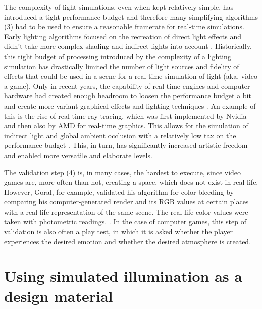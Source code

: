 The complexity of light simulations, even when kept relatively simple, has introduced a tight performance budget and therefore many simplifying algorithms (3) had to be used to ensure a reasonable framerate for real-time simulations. Early lighting algorithms focused on the recreation of direct light effects and didn't take more complex shading and indirect lights into account \cite{Niedenthal1404353}, Historically, this tight budget of processing introduced by the complexity of a lighting simulation has drastically limited the number of light sources and fidelity of effects that could be used in a scene for a real-time simulation of light (aka. video a game). Only in recent years, the capability of real-time engines and computer hardware had created enough headroom to loosen the performance budget a bit and create more variant graphical effects and lighting techniques \cite{Niedenthal1404353}. An example of this is the rise of real-time ray tracing, which was first implemented by Nvidia and then also by AMD for real-time graphics. This allows for the simulation of indirect light and global ambient occlusion with a relatively low tax on the performance budget \cite{RTXON}. This, in turn, has significantly increased artistic freedom and enabled more versatile and elaborate levels. 

The validation step (4) is, in many cases, the hardest to execute, since video games are, more often than not, creating a space, which does not exist in real life. However, Goral, for example, validated his algorithm for color bleeding by comparing his computer-generated render and its RGB values at certain places with a real-life representation of the same scene. The real-life color values were taken with photometric readings. \cite{Goral84}. In the case of computer games, this step of validation is also often a play test, in which it is asked whether the player experiences the desired emotion and whether the desired atmosphere is created. 
\newpage
\section{Using simulated illumination as a design material}

